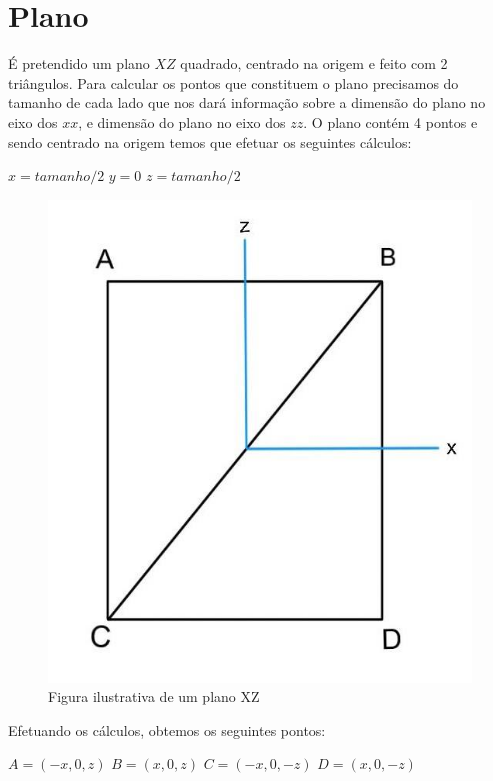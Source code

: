\documentclass{article}
\begin{document}
\section{Plano}
É pretendido um plano $XZ$ quadrado, centrado na origem e feito com 2 triângulos. 
Para calcular os pontos que constituem o plano precisamos do tamanho de cada lado que nos dará informação sobre a dimensão do plano
no eixo dos $xx$, e dimensão do plano no eixo dos $zz$. 
O plano contém 4 pontos e sendo centrado na origem temos que efetuar os seguintes cálculos: \newline
\begin{center}
$x = tamanho/2$ \newline
$y = 0$ \newline
$z = tamanho/2$ \newline
\end{center}
\begin{figure}[H]
\centering\includegraphics[scale=0.35]{plano} 
\caption{\label{fig:controller}Figura ilustrativa de um plano XZ}
\end{figure} 
Efetuando os cálculos, obtemos os seguintes pontos: \newline
\begin{center}
$A = (-x,0,z)$ \newline 
$B = (x,0,z)$ \newline 
$C = (-x,0,-z)$ \newline 
$D = (x,0,-z)$ \newline
\end{center}
\end{document}
